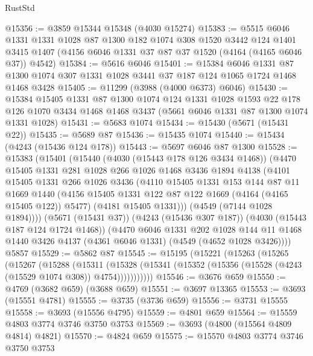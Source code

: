 \begin{lexlean}{RustStd}
\begin{coremodule}
@15356 := @3859 @15344 @15348 (@4030 @15274)
@15383 := @5515
    @6046
    @1331
    @1331
    @1028
    @87
    @1300
    @182
    @1074
    @308
    @1520
    @3442
    @124
    @1401
    @3415
    @1407
    (@4156 @6046 @1331 @37 @87 @37 @1520 (@4164 (@4165 @6046 @37)) @4542)
@15384 := @5616 @6046
@15401 := @15384
    @6046
    @1331
    @87
    @1300
    @1074
    @307
    @1331
    @1028
    @3441
    @37
    @187
    @124
    @1065
    @1724
    @1468
    @1468
    @3428
@15405 := @11299 (@3988 (@4000 @6373) @6046)
@15430 := @15384
    @15405
    @1331
    @87
    @1300
    @1074
    @124
    @1331
    @1028
    @1593
    @22
    @178
    @126
    @1070
    @3434
    @1468
    @1468
    @3437
    (@5661 @6046 @1331 @87 @1300 @1074 @1331 @1028)
@15431 := @5683 @1074
@15434 := @15430 (@5671 (@15431 @22))
@15435 := @5689 @87
@15436 := @15435 @1074
@15440 := @15434 (@4243 (@15436 @124 @178))
@15443 := @5697 @6046 @87 @1300
@15528 := @15383
    (@15401
      (@15440
        (@4030 (@15443 @178 @126 @3434 @1468))
        (@4470
          @15405
          @1331
          @281
          @1028
          @266
          @1026
          @1468
          @3436
          @1894
          @4138
          (@4101
            @15405
            @1331
            @266
            @1026
            @3436
            (@4110
              @15405
              @1331
              @153
              @144
              @87
              @11
              @1669
              @1440
              (@4156 @15405 @1331 @122 @87 @122 @1669 (@4164 (@4165 @15405 @122)) @5477)
              (@4181 @15405 @1331)))
          (@4549 (@7144 @1028 @1894))))
      (@5671 (@15431 @37))
      (@4243 (@15436 @307 @187))
      (@4030 (@15443 @187 @124 @1724 @1468))
      (@4470
        @6046
        @1331
        @202
        @1028
        @144
        @11
        @1468
        @1440
        @3426
        @4137
        (@4361 @6046 @1331)
        (@4549 (@4652 @1028 @3426))))
    @5857
@15529 := @5862 @87
@15545 := @15195
    (@15221
      (@15263
        (@15265
          (@15267
            (@15288
              (@15311
                (@15328 (@15341 (@15352 (@15356 (@15528 (@4243 (@15529 @1074 @308)) @4754)))))))))))
@15546 := @3676 @659
@15550 := @4769 (@3682 @659) (@3688 @659)
@15551 := @3697 @13365
@15553 := @3693 (@15551 @4781)
@15555 := @3735 (@3736 @659)
@15556 := @3731 @15555
@15558 := @3693 (@15556 @4795)
@15559 := @4801 @659
@15564 := @15559 @4803 @3774 @3746 @3750 @3753
@15569 := @3693 (@4800 (@15564 @4809 @4814) @4821)
@15570 := @4824 @659
@15575 := @15570 @4803 @3774 @3746 @3750 @3753

\end{coremodule}
\end{lexlean}

